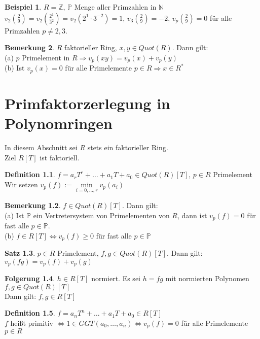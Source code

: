 \documentclass[10pt,a4paper,numbers=endperiod]{scrreprt}
\theoremstyle{definition}
\newtheorem{satz}{Satz}[section]
\newtheorem{defi}[satz]{Definition}
\newtheorem{bem}[satz]{Bemerkung}
\newtheorem{bsp}[satz]{Beispiel}
\newtheorem{folg}[satz]{Folgerung}
\def\NN{{\mathbb N}}
\def\ZZ{{\mathbb Z}}
\def\PP{{\mathbb P}}
\begin{document}
\begin{bsp}
	$R = \ZZ$, $\PP$ Menge aller Primzahlen in $\NN$\\
	$v_2(\frac{2}{9}) = v_2(\frac{2^1}{3^2}) = v_2(2^1\cdot3^{-2}) = 1$, $v_3(\frac{2}{9}) = -2$, $v_p(\frac{2}{9}) = 0$ für alle Primzahlen $p \neq 2,3$.
\end{bsp}

\begin{bem}
	$R$ faktorieller Ring, $x,y \in Quot(R)$. Dann gilt:\\
	(a) $p$ Primelement in $R \Rightarrow  v_p(xy) = v_p(x) + v_p(y)$\\
	(b) Ist $v_p(x) = 0$ für alle Primelemente $p \in R \Rightarrow x \in R^*$
\end{bem}

\chapter{Primfaktorzerlegung in Polynomringen}

In diesem Abschnitt sei $R$ stets ein faktorieller Ring.\\
Ziel $R[T]$ ist faktoriell.

\begin{defi}
	$f = a_rT^r+ \ldots + a_1T + a_0 \in Quot(R)[T]$, $p \in R$ Primelement\\
	Wir setzen $v_p(f) := \min\limits_{i = 0, \ldots, r} v_p(a_i)$
\end{defi}

\begin{bem}
	$f \in Quot(R)[T]$. Dann gilt:\\
	(a) Ist $\PP$ ein Vertretersystem von Primelementen von $R$, dann ist $v_p(f) = 0$ für fast alle $p \in \PP$.\\
	(b) $f \in R[T] \Leftrightarrow v_p(f) \geq 0$ für fast alle $p \in \PP$
\end{bem}

\begin{satz}
	$p \in R$ Primelement, $f, g \in Quot(R)[T]$. Dann gilt:\\
	$v_p(fg) = v_p(f) + v_p(g)$
\end{satz}

\begin{folg}
	$h \in R[T]$ normiert. Es sei $h = fg$ mit normierten Polynomen $f,g \in Quot(R)[T]$\\
	Dann gilt: $f,g \in R[T]$
\end{folg}

\begin{defi}
	$f = a_nT^n + \ldots + a_1T + a_0 \in R[T]$\\
	$f$ heißt primitiv $\Leftrightarrow 1 \in GGT(a_0, \ldots, a_n) \Leftrightarrow v_p(f) = 0$ für alle Primelemente $p \in R$
\end{defi}
\end{document}
